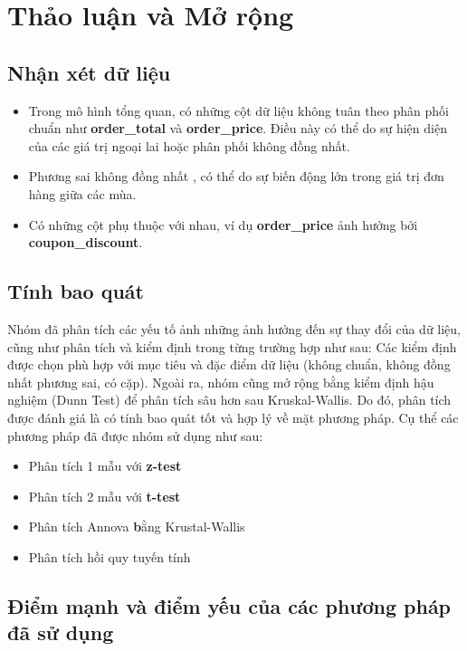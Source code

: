 \vfil{}\vfilneg
\section{Thảo luận và Mở rộng}

\subsection{Nhận xét dữ liệu}
\begin{itemize}
    \item  Trong mô hình tổng quan, có những cột dữ liệu không tuân theo phân phối chuẩn như \textbf{order\_total} và \textbf{order\_price}. Điều này có thể do sự hiện diện của các giá trị ngoại lai hoặc phân phối không đồng nhất.
    \item Phương sai không đồng nhất , có thể do sự biến động lớn trong giá trị đơn hàng giữa các mùa. 
    \item Có những cột phụ thuộc với nhau, ví dụ \textbf{order\_price} ảnh hưởng bởi \textbf{coupon\_discount}.

\end{itemize}

\subsection{Tính bao quát}

Nhóm đã phân tích các yếu tố ảnh những ảnh hưởng đến sự thay đổi của dữ liệu, cũng như phân tích và kiểm định trong từng trường hợp như sau:
Các kiểm định được chọn phù hợp với mục tiêu và đặc điểm dữ liệu (không chuẩn, không đồng nhất phương sai, có cặp). Ngoài ra, nhóm cũng mở rộng bằng kiểm định hậu nghiệm (Dunn Test) để phân tích sâu hơn sau Kruskal-Wallis. Do đó, phân tích được đánh giá là có tính bao quát tốt và hợp lý về mặt phương pháp.
Cụ thể các phương pháp đã được nhóm sử dụng như sau: 
\begin{itemize}
    \item Phân tích 1 mẫu với \textbf{z-test}
    \item Phân tích 2 mẫu với \textbf{t-test}
    \item Phân tích Annova \textbf bằng {Krustal-Wallis}
    \item Phân tích hồi quy tuyến tính
\end{itemize}
\subsection{Điểm mạnh và điểm yếu của các phương pháp đã sử dụng}

